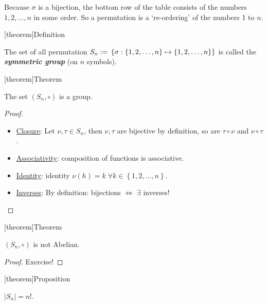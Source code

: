 \documentclass[12pt]{report}
\theoremstyle{definition}
\begin{document}
    Because $\sigma$ is a bijection, the bottom row of the table consists of the numbers
    $1, 2, \ldots, n$ in some order. So a permutation is a `re-ordering' of the numbers 1 to $n$.

[theorem]{Definition}
\begin{symmetric group}
    The set of all permutation $S_n := \\\left\{ \sigma : 
    \left\{1, 2, \ldots, n\right\}  \mapsto \left\{1, 2, \ldots, n\right\} \right\} $
    is called the \textbf{\emph{symmetric group}} (on $n$ symbols).
\end{symmetric group}

[theorem]{Theorem}
\begin{permutation is a group}
    The set $(S_n, \circ)$ is a group.
\end{permutation is a group}

\begin{proof}
    \,

    \begin{itemize}
            \item \underline{Closure}: Let $\nu, \tau \in S_n$, 
                then $\nu, \tau$ are bijective by definition,
                so are $\tau \circ \nu$ and $\nu \circ \tau$.
            \item \underline{Associativity}: composition of functions is associative.
            \item \underline{Identity}: identity $\nu (h) = k \;\forall k \in \left\{1, 2, \ldots, n\right\} $.
            \item \underline{Inverses}: By definition: bijections $\iff$ $\exists$ inverses!
    \end{itemize}
\end{proof}

[theorem]{Theorem}
\begin{permutation is not Abelian}
    $(S_n, \circ)$ is not Abelian.
\end{permutation is not Abelian}

\begin{proof}
    Exercise!
\end{proof}

[theorem]{Proposition}
\begin{order of Sn is n!}
    $|S_n| = {n!}$.
\end{order of Sn is n!}
\end{document}
